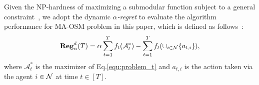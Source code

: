 Given the NP-hardness of maximizing a  submodular function subject to a general constraint~\citep{vondrak2013symmetry,bian2017guaranteed}, we adopt the dynamic \emph{$\alpha$-regret} to evaluate the algorithm performance for MA-OSM problem in this paper, which is defined as
follows~\citep{kakade2007playing,streeter2008online,chen2018online}:\vspace{-1.0em}
\begin{equation*}
\textbf{Reg}^{d}_{\alpha}(T)=\alpha\sum_{t=1}^{T}f_{t}(\mathcal{A}_{t}^{*})-\sum_{t=1}^{T}f_{t}(\cup_{i\in\mathcal{N}}\{a_{t,i}\}),
\end{equation*}\vspace{-0.5em}where $\mathcal{A}_{t}^{*}$ is the maximizer of Eq.\eqref{equ:problem_t} and  $a_{t,i}$ is the action taken via the agent $i\in\mathcal{N}$ at time $t\in[T]$.